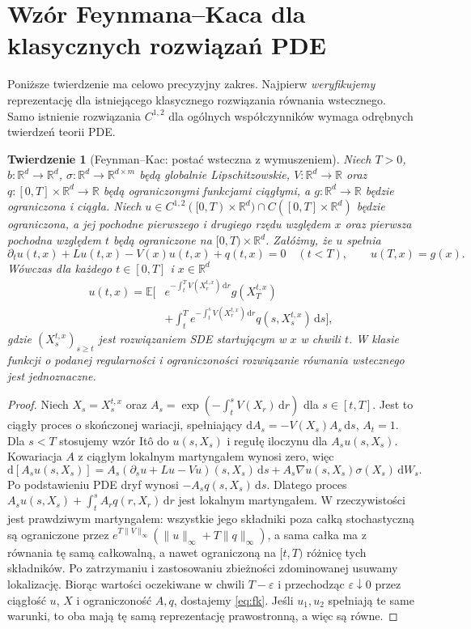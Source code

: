 \documentclass[11pt,a4paper,oneside]{report}
\numberwithin{equation}{chapter}
\theoremstyle{plain}
\newtheorem{twierdzenie}{Twierdzenie}[chapter]
\theoremstyle{definition}
\theoremstyle{remark}
\newcommand{\R}{\mathbb{R}}
\newcommand{\E}{\mathbb{E}}
\newcommand{\dd}{\mathrm{d}}
\newcommand{\norm}[1]{\lVert #1\rVert}
\begin{document}
\section{Wzór Feynmana--Kaca dla klasycznych rozwiązań PDE}\label{sec:volIII:07:04}

Poniższe twierdzenie ma celowo precyzyjny zakres.
Najpierw \emph{weryfikujemy} reprezentację dla
istniejącego klasycznego rozwiązania równania wstecznego.
Samo istnienie rozwiązania $C^{1,2}$ dla ogólnych
współczynników wymaga odrębnych twierdzeń teorii PDE.

\begin{twierdzenie}[Feynman--Kac: postać wsteczna z wymuszeniem]\label{thm:volIII:07:04}
\label{th:feynman-kac}
Niech $T>0$, $b:\R^d\to\R^d$,
$\sigma:\R^d\to\R^{d\times m}$ będą globalnie
Lipschitzowskie, $V:\R^d\to\R$ oraz
$q:[0,T]\times\R^d\to\R$ będą ograniczonymi funkcjami
ciągłymi, a $g:\R^d\to\R$ będzie ograniczona
i ciągła. Niech $u\in C^{1,2}([0,T)\times\R^d)
\cap C([0,T]\times\R^d)$ będzie ograniczona,
a jej pochodne pierwszego i drugiego rzędu względem
$x$ oraz pierwsza pochodna względem $t$ będą
ograniczone na $[0,T)\times\R^d$.
Załóżmy, że $u$ spełnia
\[
\partial_tu(t,x)+Lu(t,x)-V(x)u(t,x)+q(t,x)=0
\quad (t<T),\qquad u(T,x)=g(x).
\]
Wówczas dla każdego $t\in[0,T]$ i $x\in\R^d$
\[
\begin{split}
u(t,x)=\E\Big[&e^{-\int_t^T V(X_r^{t,x})\,\dd r}
                         g(X_T^{t,x})\\
 &+\int_t^T e^{-\int_t^s V(X_r^{t,x})\,\dd r}
                         q(s,X_s^{t,x})\,\dd s\Big],
\end{split}
\tag{7.1}\label{eq:fk}
\]
gdzie $(X_s^{t,x})_{s\ge t}$ jest rozwiązaniem SDE
startującym w $x$ w chwili $t$.
W klasie funkcji o podanej regularności i ograniczoności
rozwiązanie równania wstecznego jest jednoznaczne.
\end{twierdzenie}
\begin{proof}
Niech $X_s=X_s^{t,x}$ oraz
$A_s=\exp(-\int_t^sV(X_r)\,\dd r)$ dla $s\in[t,T]$.
Jest to ciągły proces o skończonej wariacji, spełniający
$\dd A_s=-V(X_s)A_s\,\dd s$, $A_t=1$.
Dla $s<T$ stosujemy wzór Itô do $u(s,X_s)$
i regułę iloczynu dla $A_su(s,X_s)$.
Kowariacja $A$ z ciągłym lokalnym martyngałem wynosi zero,
więc
\[
\dd[A_su(s,X_s)]
=A_s(\partial_su+Lu-Vu)(s,X_s)\,\dd s
 +A_s\nabla u(s,X_s)\sigma(X_s)\,\dd W_s.
\]
Po podstawieniu PDE dryf wynosi $-A_sq(s,X_s)\,\dd s$.
Dlatego proces
$A_su(s,X_s)+\int_t^sA_rq(r,X_r)\,\dd r$
jest lokalnym martyngałem. W rzeczywistości jest
prawdziwym martyngałem: wszystkie jego składniki poza
całką stochastyczną są ograniczone przez
$e^{T\norm V_\infty}(\norm u_\infty+T\norm q_\infty)$,
a sama całka ma z równania tę samą całkowalną,
a nawet ograniczoną na $[t,T)$ różnicę tych składników.
Po zatrzymaniu i zastosowaniu zbieżności zdominowanej
usuwamy lokalizację. Biorąc wartości oczekiwane
w chwili $T-\varepsilon$ i przechodząc $\varepsilon\downarrow0$
przez ciągłość $u$, $X$ i ograniczoność $A,q$, dostajemy
\eqref{eq:fk}.
Jeśli $u_1,u_2$ spełniają te same warunki, to oba
mają tę samą reprezentację prawostronną, a więc są równe.
\end{proof}
\end{document}
